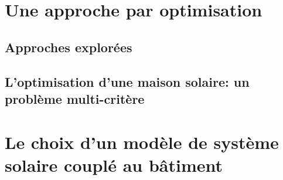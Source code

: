 \section{Une approche par optimisation} %
\label{sec:une_approche_par_optimisation}

\subsection{Approches explorées} %
\label{sub:approches_explorees}

\subsection{L’optimisation d’une maison solaire: un problème multi-critère} %
\label{sub:l_optimisation_d_une_maison_solaire_un_probleme_multi_critere}


\section{Le choix d’un modèle de système solaire couplé au bâtiment} %
\label{sec:le_choix_d_un_modele_de_systeme_solaire_couple_au_batiment}
